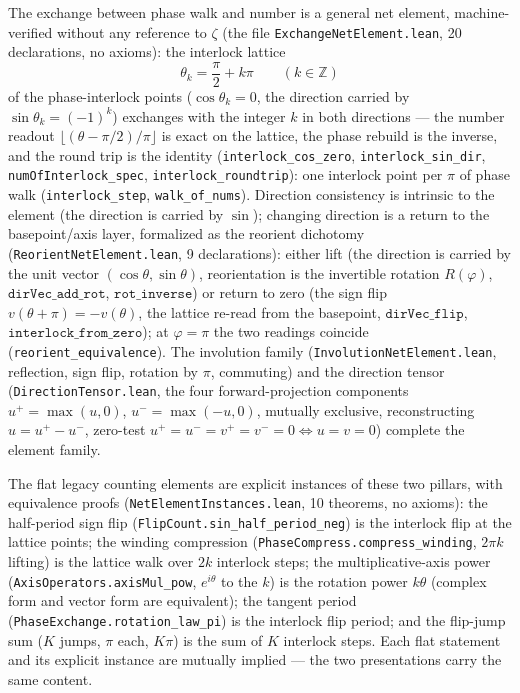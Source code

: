 \documentclass{article}
\newcommand{\Z}{\mathbb{Z}}
\newcommand{\zt}{\zeta}
\begin{document}
The exchange between phase walk and number is a general net element,
machine-verified without any reference to $\zt$ (the file
\texttt{ExchangeNetElement.lean}, 20 declarations, no axioms): the
interlock lattice
\begin{equation}
  \theta_k = \frac{\pi}{2} + k\pi \qquad (k\in\Z)
  \label{eq:interlock}
\end{equation}
of the phase-interlock points ($\cos\theta_k=0$, the direction
carried by $\sin\theta_k=(-1)^k$) exchanges with the integer $k$ in
both directions --- the number readout $\lfloor(\theta-\pi/2)/\pi\rfloor$
is exact on the lattice, the phase rebuild is the inverse, and the
round trip is the identity
(\texttt{interlock\_cos\_zero},
\texttt{interlock\_sin\_dir},
\texttt{numOfInterlock\_spec},
\texttt{interlock\_roundtrip}): one interlock point per $\pi$ of phase
walk (\texttt{interlock\_step}, \texttt{walk\_of\_nums}). Direction
consistency is intrinsic to the element (the direction is carried by
$\sin$); changing direction is a return to the basepoint/axis layer,
formalized as the reorient dichotomy (\texttt{ReorientNetElement.lean},
9 declarations): either lift (the direction is carried by the unit
vector $(\cos\theta,\sin\theta)$, reorientation is the invertible
rotation $R(\varphi)$, $\texttt{dirVec\_add\_rot}$,
$\texttt{rot\_inverse}$) or return to zero (the sign flip
$v(\theta+\pi)=-v(\theta)$, the lattice re-read from the basepoint,
$\texttt{dirVec\_flip}$, $\texttt{interlock\_from\_zero}$); at
$\varphi=\pi$ the two readings coincide
(\texttt{reorient\_equivalence}). The involution family
(\texttt{InvolutionNetElement.lean}, reflection, sign flip, rotation
by $\pi$, commuting) and the direction tensor
(\texttt{DirectionTensor.lean}, the four forward-projection components
$u^+=\max(u,0)$, $u^-=\max(-u,0)$, mutually exclusive, reconstructing
$u=u^+-u^-$, zero-test $u^+=u^-=v^+=v^-=0\iff u=v=0$) complete the
element family.

The flat legacy counting elements are explicit instances of these two
pillars, with equivalence proofs (\texttt{NetElementInstances.lean},
10 theorems, no axioms): the half-period sign flip
(\texttt{FlipCount.sin\_half\_period\_neg}) is the interlock flip at
the lattice points; the winding compression
(\texttt{PhaseCompress.compress\_winding}, $2\pi k$ lifting) is the
lattice walk over $2k$ interlock steps; the multiplicative-axis power
(\texttt{AxisOperators.axisMul\_pow}, $e^{i\theta}$ to the $k$) is
the rotation power $k\theta$ (complex form and vector form are
equivalent); the tangent period
(\texttt{PhaseExchange.rotation\_law\_pi}) is the interlock flip
period; and the flip-jump sum ($K$ jumps, $\pi$ each, $K\pi$) is the
sum of $K$ interlock steps. Each flat statement and its explicit
instance are mutually implied --- the two presentations carry the
same content.
\end{document}
